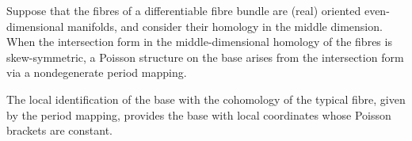 Suppose that the fibres of a differentiable fibre bundle are (real) oriented even-dimensional manifolds, and consider their homology in the middle dimension. When the intersection form in the middle-dimensional homology of the fibres is skew-symmetric, a Poisson structure on the base arises from the intersection form via a nondegenerate period mapping.

The local identification of the base with the cohomology of the typical fibre, given by the period mapping, provides the base with local coordinates whose Poisson brackets are constant.
